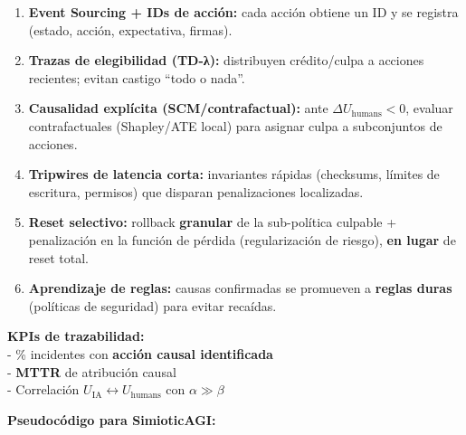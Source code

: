 \begin{enumerate}
\def\labelenumi{\arabic{enumi})}
\tightlist
\item
  \textbf{Event Sourcing + IDs de acción:} cada acción obtiene un ID y
  se registra (estado, acción, expectativa, firmas).
\item
  \textbf{Trazas de elegibilidad (TD-λ):} distribuyen crédito/culpa a
  acciones recientes; evitan castigo ``todo o nada''.
\item
  \textbf{Causalidad explícita (SCM/contrafactual):} ante
  \(\Delta U_{\text{humans}}<0\), evaluar contrafactuales (Shapley/ATE
  local) para asignar culpa a subconjuntos de acciones.
\item
  \textbf{Tripwires de latencia corta:} invariantes rápidas (checksums,
  límites de escritura, permisos) que disparan penalizaciones
  localizadas.
\item
  \textbf{Reset selectivo:} rollback \textbf{granular} de la
  sub-política culpable + penalización en la función de pérdida
  (regularización de riesgo), \textbf{en lugar} de reset total.
\item
  \textbf{Aprendizaje de reglas:} causas confirmadas se promueven a
  \textbf{reglas duras} (políticas de seguridad) para evitar recaídas.
\end{enumerate}

\textbf{KPIs de trazabilidad:}\\
- \% incidentes con \textbf{acción causal identificada}\\
- \textbf{MTTR} de atribución causal\\
- Correlación \(U_{\text{IA}}\leftrightarrow U_{\text{humans}}\) con
\(\alpha \gg \beta\)

\textbf{Pseudocódigo para SimioticAGI:}

\begin{Shaded}
\begin{Highlighting}[]
\OperatorTok{=}
     
\OperatorTok{=}
\end{Highlighting}
\end{Shaded}

